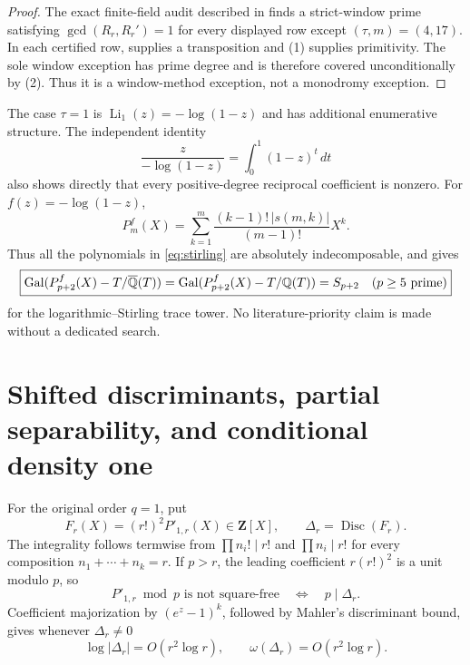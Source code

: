 \begin{proof}
The exact finite-field audit described in
 finds a strict-window prime satisfying
$\gcd(R_r,R_r')=1$ for every displayed row except
$(\tau,m)=(4,17)$.  In each certified row,  supplies a
transposition and (1) supplies primitivity.  The sole
window exception has prime degree and is therefore covered unconditionally
by (2).  Thus it is a window-method exception, not a
monodromy exception.
\end{proof}

The case $\tau=1$ is $\operatorname{Li}_1(z)=-\log(1-z)$ and has additional
enumerative structure. The independent identity
\[
\frac z{-\log(1-z)}=\int_0^1(1-z)^t\,dt
\]
also shows directly that every positive-degree reciprocal coefficient is
nonzero. For
$f(z)=-\log(1-z)$,
\begin{equation}
P_m^f(X)=\sum_{k=1}^m
\frac{(k-1)!\,|s(m,k)|}{(m-1)!}X^k.
\label{eq:stirling}
\end{equation}
Thus all the polynomials in \eqref{eq:stirling} are absolutely
indecomposable, and  gives
\begin{equation}
\boxed{
\operatorname{Gal}(P_{p+2}^f(X)-T/\overline{\mathbb Q}(T))
=\operatorname{Gal}(P_{p+2}^f(X)-T/\mathbb Q(T))=S_{p+2}
\quad(p\ge5\text{ prime})}
\label{eq:stirling-mon}
\end{equation}
for the logarithmic--Stirling trace tower. No literature-priority claim is
made without a dedicated search.

\section{Shifted discriminants, partial separability, and conditional density one}

For the original order $q=1$, put
\begin{equation}
F_r(X)=(r!)^2P'_{1,r}(X)\in\mathbf Z[X],
\qquad
\Delta_r=\operatorname{Disc}(F_r).
\label{eq:Delta}
\end{equation}
The integrality follows termwise from $\prod n_i!\mid r!$ and
$\prod n_i\mid r!$ for every composition $n_1+\cdots+n_k=r$. If $p>r$,
the leading coefficient $r(r!)^2$ is a unit modulo $p$, so
\begin{equation}
\boxed{
P'_{1,r}\bmod p\text{ is not square-free}
\quad\Longleftrightarrow\quad p\mid\Delta_r.}
\label{eq:Delta-equivalence}
\end{equation}
Coefficient majorization by $(e^z-1)^k$, followed by Mahler's
discriminant bound, gives whenever $\Delta_r\ne0$
\begin{equation}
\log|\Delta_r|=O(r^2\log r),
\qquad
\omega(\Delta_r)=O(r^2\log r).
\label{eq:Delta-bound}
\end{equation}

